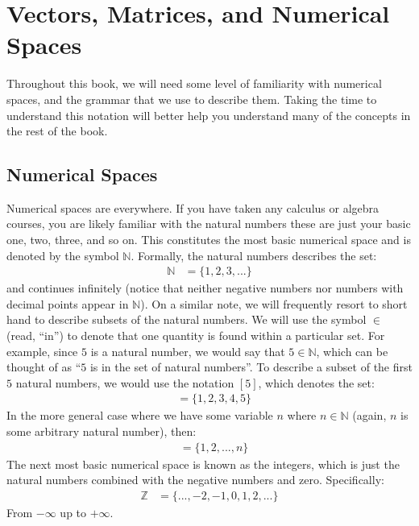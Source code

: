 \documentclass[letterpaper,10pt,english]{jupyterBook}
\begin{document}
\section{Vectors, Matrices, and Numerical Spaces}
\label{\detokenize{introduction/terminology:vectors-matrices-and-numerical-spaces}}
\sphinxAtStartPar
Throughout this book, we will need some level of familiarity with numerical spaces, and the grammar that we use to describe them. Taking the time to understand this notation will better help you understand many of the concepts in the rest of the book.


\subsection{Numerical Spaces}
\label{\detokenize{introduction/terminology:numerical-spaces}}
\sphinxAtStartPar
Numerical spaces are everywhere. If you have taken any calculus or algebra courses, you are likely familiar with the natural numbers \sphinxhyphen{} these are just your basic one, two, three, and so on. This constitutes the most basic numerical space and is denoted by the symbol \(\mathbb N\). Formally, the natural numbers describes the set:
\begin{align*}
    \mathbb N &= \{1, 2, 3, ...\}
\end{align*}
\sphinxAtStartPar
and continues infinitely (notice that neither negative numbers nor numbers with decimal points appear in \(\mathbb N\)). On a similar note, we will frequently resort to short hand to describe subsets of the natural numbers. We will use the symbol \(\in\) (read, “in”) to denote that one quantity is found within a particular set. For example, since \(5\) is a natural number, we would say that \(5 \in \mathbb N\), which can be thought of as “\(5\) is in the set of natural numbers”. To describe a subset of the first \(5\) natural numbers, we would use the notation \([5]\), which denotes the set:
\begin{align*}
    [5] &= \{1,2,3,4,5\}
\end{align*}
\sphinxAtStartPar
In the more general case where we have some variable \(n\) where \(n \in \mathbb N\) (again, \(n\) is some arbitrary natural number), then:
\begin{align*}
    [n] &= \{1,2,...,n\}
\end{align*}
\sphinxAtStartPar
The next most basic numerical space is known as the integers, which is just the natural numbers combined with the negative numbers and zero. Specifically:
\begin{align*}
    \mathbb Z &= \{..., -2, -1, 0, 1, 2, ...\}
\end{align*}
\sphinxAtStartPar
From \(-\infty\) up to \(+\infty\).
\end{document}

